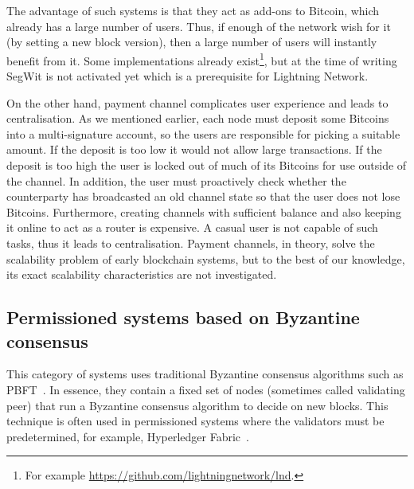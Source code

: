 The advantage of such systems is that they act as add-ons to Bitcoin, which already has a large number of users.
Thus, if enough of the network wish for it (by setting a new block version),
then a large number of users will instantly benefit from it.
Some implementations already exist\footnote{For example \url{https://github.com/lightningnetwork/lnd}.},
but at the time of writing SegWit is not activated yet which is a prerequisite for Lightning Network.

On the other hand, payment channel complicates user experience and leads to centralisation.
As we mentioned earlier, each node must deposit some Bitcoins into a multi-signature account,
so the users are responsible for picking a suitable amount.
If the deposit is too low it would not allow large transactions.
If the deposit is too high the user is locked out of much of its Bitcoins for use outside of the channel.
In addition, the user must proactively check whether the counterparty has broadcasted an old channel state so that the user does not lose Bitcoins.
Furthermore, creating channels with sufficient balance and also keeping it online to act as a router is expensive.
A casual user is not capable of such tasks, thus it leads to centralisation.
Payment channels, in theory, solve the scalability problem of early blockchain systems,
but to the best of our knowledge, its exact scalability characteristics are not investigated.



\subsection{Permissioned systems based on Byzantine consensus}

This category of systems uses traditional Byzantine consensus algorithms such as PBFT~\cite{castro1999practical}.
In essence, they contain a fixed set of nodes (sometimes called validating peer) that run a Byzantine consensus algorithm to decide on new blocks.
This technique is often used in permissioned systems where the validators must be predetermined,
for example, Hyperledger Fabric~\cite{cachin2016architecture}.

